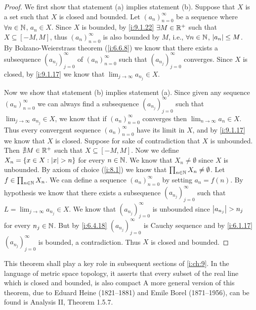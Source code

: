 \begin{proof}
  We first show that statement (a) implies statement (b).
  Suppose that \(X\) is a set such that \(X\) is closed and bounded.
  Let \((a_n)_{n = 0}^\infty\) be a sequence where \(\forall n \in \mathbb{N}\), \(a_n \in X\).
  Since \(X\) is bounded, by \cref{i:9.1.22} \(\exists M \in \mathbb{R}^+\) such that \(X \subseteq [-M, M]\), thus \((a_n)_{n = 0}^\infty\) is also bounded by \(M\), i.e., \(\forall n \in \mathbb{N}\), \(\left\lvert a_n\right\rvert \leq M\).
  By Bolzano-Weierstrass theorem (\cref{i:6.6.8}) we know that there exists a subsequence \((a_{n_j})_{j = 0}^\infty\) of \((a_n)_{n = 0}^\infty\) such that \((a_{n_j})_{j = 0}^\infty\) converges.
  Since \(X\) is closed, by \cref{i:9.1.17} we know that \(\lim_{j \to \infty} a_{n_j} \in X\).

  Now we show that statement (b) implies statement (a).
  Since given any sequence \((a_n)_{n = 0}^\infty\) we can always find a subsequence \((a_{n_j})_{j = 0}^\infty\) such that \(\lim_{j \to \infty} a_{n_j} \in X\), we know that if \((a_n)_{n = 0}^\infty\) converges then \(\lim_{n \to \infty} a_n \in X\).
  Thus every convergent sequence \((a_n)_{n = 0}^\infty\) have its limit in \(X\), and by \cref{i:9.1.17} we know that \(X\) is closed.
  Suppose for sake of contradiction that \(X\) is unbounded.
  Then \(\nexists M \in \mathbb{R}^+\) such that \(X \subseteq [-M, M]\).
  Now we define \(X_n = \left\lbrace x \in X : \left\lvert x\right\rvert > n\right\rbrace\) for every \(n \in \mathbb{N}\).
  We know that \(X_n \neq \emptyset\) since \(X\) is unbounded.
  By axiom of choice (\cref{i:8.1}) we know that \(\prod_{n \in \mathbb{N}} X_n \neq \emptyset\).
  Let \(f \in \prod_{n \in \mathbb{N}} X_n\).
  We can define a sequence \((a_n)_{n = 0}^\infty\) by setting \(a_n = f(n)\).
  By hypothesis we know that there exists a subsequence \((a_{n_j})_{j = 0}^\infty\) such that \(L = \lim_{j \to \infty} a_{n_j} \in X\).
  We know that \((a_{n_j})_{j = 0}^\infty\) is unbounded since \(\left\lvert a_{n_j}\right\rvert > n_j\) for every \(n_j \in \mathbb{N}\).
  But by \cref{i:6.4.18} \((a_{n_j})_{j = 0}^\infty\) is Cauchy sequence and by \cref{i:6.1.17} \((a_{n_j})_{j = 0}^\infty\) is bounded, a contradiction.
  Thus \(X\) is closed and bounded.
\end{proof}

\begin{rmk}\label{i:9.1.25}
  This theorem shall play a key role in subsequent sections of \cref{i:ch:9}.
  In the language of metric space topology, it asserts that every subset of the real line which is closed and bounded, is also compact
  A more general version of this theorem, due to Eduard Heine (1821--1881) and Emile Borel (1871--1956), can be found is Analysis II, Theorem 1.5.7.
\end{rmk}

